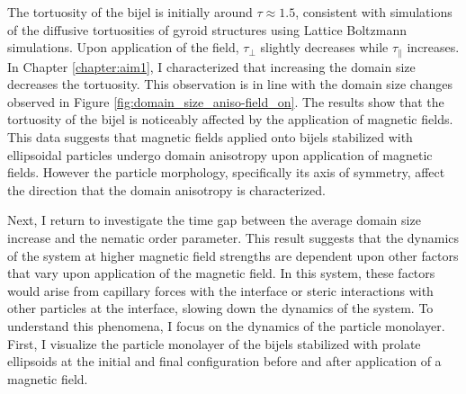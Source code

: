 The tortuosity of the bijel is initially around $\tau \approx 1.5$, consistent with simulations of the diffusive tortuosities of gyroid structures using 
Lattice Boltzmann simulations. \cite{luo_macroscopic_2020} Upon application of the field, $\tau_{\perp}$ slightly decreases while $\tau_{\parallel}$
increases. In Chapter \ref{chapter:aim1}, I characterized that increasing the domain size decreases the tortuosity. \cite{karthikeyan_formation_2024} This
observation is in line with the domain size changes observed in Figure \ref{fig:domain_size_aniso-field_on}. The results show that the
tortuosity of the bijel is noticeably affected by the application of magnetic fields. This data suggests that magnetic fields applied onto
bijels stabilized with ellipsoidal particles undergo domain anisotropy upon application of magnetic fields. However the particle morphology,
specifically its axis of symmetry, affect the direction that the domain anisotropy is characterized.

Next, I return to investigate the time gap between the average domain size increase and the nematic order parameter. This result suggests that the dynamics 
of the system at higher magnetic field strengths are dependent upon other factors that vary upon application of the magnetic field. In this system, these factors
would arise from capillary forces with the interface or steric interactions with other particles at the interface, slowing down the dynamics of the system.
To understand this phenomena, I focus on the dynamics of the particle monolayer. First, I visualize the particle monolayer of the bijels stabilized with prolate 
ellipsoids at the initial and final configuration before and after application of a magnetic field.

